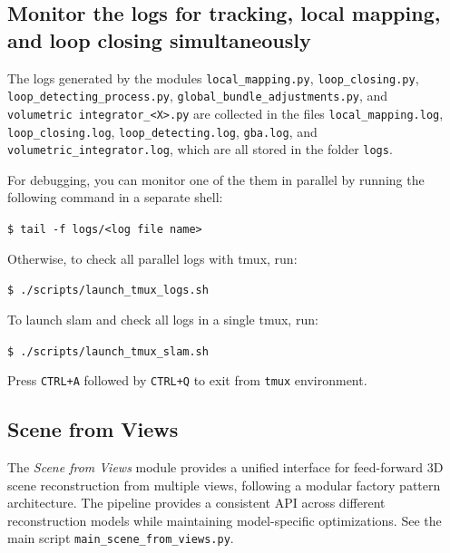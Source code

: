 \documentclass{article}
\newenvironment{Shaded}{\begin{snugshade}}{\end{snugshade}}
\newcommand{\BuiltInTok}[1]{\textcolor[rgb]{0.74,0.68,0.62}{#1}}
\newcommand{\ExtensionTok}[1]{\textcolor[rgb]{0.74,0.68,0.62}{#1}}
\newcommand{\NormalTok}[1]{\textcolor[rgb]{0.74,0.68,0.62}{#1}}
\newcommand{\codeline}[1]{\texttt{\NormalTok{\$ }\BuiltInTok{\ExtensionTok{#1}}}}
\newenvironment{codeblock}
{
\begin{scriptsize}
\begin{Shaded}
}
{
\end{Shaded}
\end{scriptsize}
}
\begin{document}
\hypertarget{monitor-the-logs-for-tracking-local-mapping-and-loop-closing-simultaneously}{%
\subsection{Monitor the logs for tracking, local mapping, and loop
closing
simultaneously}\label{monitor-the-logs-for-tracking-local-mapping-and-loop-closing-simultaneously}}

The logs generated by the modules \texttt{local\_mapping.py},
\texttt{loop\_closing.py}, \texttt{loop\_detecting\_process.py},
\texttt{global\_bundle\_adjustments.py}, and
\texttt{volumetric\ integrator\_\textless{}X\textgreater{}.py} are
collected in the files \texttt{local\_mapping.log},
\texttt{loop\_closing.log}, \texttt{loop\_detecting.log},
\texttt{gba.log}, and \texttt{volumetric\_integrator.log}, which are all
stored in the folder \texttt{logs}. 

For debugging, you can monitor one
of the them in parallel by running the following command in a separate
shell:\\
\begin{codeblock}
\codeline{tail\ -f\ logs/\textless{}log\ file\ name\textgreater{}}
\end{codeblock}
Otherwise, to check all parallel logs with tmux, run:\\
\begin{codeblock}
\codeline{./scripts/launch\_tmux\_logs.sh}
\end{codeblock}
To launch slam and check all logs in a single tmux, run:\\
\begin{codeblock}
\codeline{./scripts/launch\_tmux\_slam.sh}
\end{codeblock}
Press \texttt{CTRL+A} followed by \texttt{CTRL+Q} to exit from
\texttt{tmux} environment.

\hypertarget{scene-from-views-usage}{%
\subsection{Scene from Views}\label{scene-from-views-usage}}

The \textit{Scene from Views} module provides a unified interface for feed-forward 3D scene reconstruction from multiple
views, following a modular factory pattern architecture. The pipeline
provides a consistent API across different reconstruction models while
maintaining model-specific optimizations. See the main script
\texttt{main\_scene\_from\_views.py}.
\end{document}
